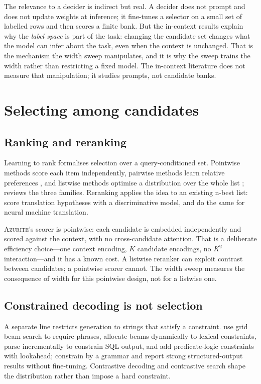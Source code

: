 The relevance to a decider is indirect but real. A decider does not prompt and
does not update weights at inference; it fine-tunes a selector on a small set of
labelled rows and then scores a finite bank. But the in-context results explain
why the \emph{label space} is part of the task: changing the candidate set changes
what the model can infer about the task, even when the context is unchanged. That
is the mechanism the width sweep manipulates, and it is why the sweep trains the
width rather than restricting a fixed model. The in-context literature does not
measure that manipulation; it studies prompts, not candidate banks.

\section{Selecting among candidates}

\subsection{Ranking and reranking}

Learning to rank formalises selection over a query-conditioned set. Pointwise
methods score each item independently, pairwise methods learn relative preferences
\citep{burges2005ranknet}, and listwise methods optimise a distribution over the
whole list \citep{cao2007listnet}; \citet{liu2009ltr} reviews the three families.
Reranking applies the idea to an existing n-best list: \citet{shen2004reranking}
score translation hypotheses with a discriminative model, and
\citet{lee2021reranking} do the same for neural machine translation.

\textsc{Azurite}'s scorer is pointwise: each candidate is embedded independently
and scored against the context, with no cross-candidate attention. That is a
deliberate efficiency choice---one context encoding, $K$ candidate encodings, no
$K^2$ interaction---and it has a known cost. A listwise reranker can exploit
contrast between candidates; a pointwise scorer cannot. The width sweep measures
the consequence of width for this pointwise design, not for a listwise one.

\subsection{Constrained decoding is not selection}

A separate line restricts generation to strings that satisfy a constraint.
\citet{hokamp2017grid} use grid beam search to require phrases,
\citet{post2018fast} allocate beams dynamically to lexical constraints,
\citet{scholak2021picard} parse incrementally to constrain SQL output, and
\citet{lu2020neurologic} add predicate-logic constraints with lookahead;
\citet{geng2023grammar} constrain by a grammar and report strong structured-output
results without fine-tuning. Contrastive decoding \citep{li2022contrastive} and
contrastive search \citep{su2022contrastive} shape the distribution rather than
impose a hard constraint.

